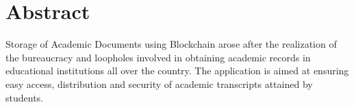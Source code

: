 \chapter*{Abstract}

Storage of Academic Documents using Blockchain arose after the realization of the bureaucracy and loopholes involved in obtaining academic records in educational institutions all over the country. The application is aimed at ensuring easy access, distribution and security of academic transcripts attained by students.

